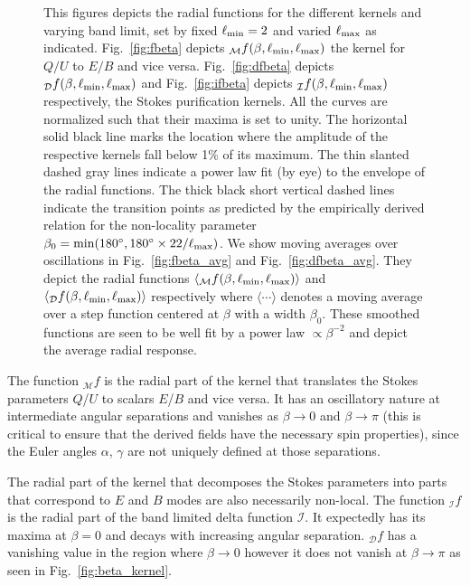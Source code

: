 \documentclass[a4paper,11pt]{article}
\newcommand{\mm}{\mathcal{M}}
\newcommand{\md}{\mathcal{D}}
\newcommand{\mi}{\mathcal{I}}
\def\fig#1{{Fig.~\ref{#1}}}
\begin{document}
\begin{figure}[t]
\caption{This figures depicts the radial functions for the different kernels and varying band limit, set by fixed $\ell_{\rm min}=2$ and varied $\ell_{\rm max}$ as indicated. \fig{fig:fbeta} depicts ${_{\mm}f}(\beta,\ell_{\rm min},\ell_{\rm max})$ the kernel for $Q/U$ to $E/B$ and vice versa. \fig{fig:dfbeta} depicts ${}_{\md}f(\beta,\ell_{\rm min},\ell_{\rm max})$ and  \fig{fig:ifbeta} depicts ${}_{\mi}f(\beta,\ell_{\rm min},\ell_{\rm max})$ respectively, the Stokes purification kernels. All the curves are normalized such that their maxima is set to unity. The horizontal solid black line marks the location where the amplitude of the respective kernels fall below 1\% of its maximum. The thin slanted dashed gray lines indicate a power law fit (by eye) to the envelope of the radial functions. The thick black short vertical dashed lines indicate the transition points as predicted by the empirically derived relation for the non-locality parameter $\beta_0={\rm min}(180^\circ,180^\circ \times 22/\ell_{\rm max})$.  We show moving averages over oscillations in \fig{fig:fbeta_avg} and  \fig{fig:dfbeta_avg}.  They depict the radial functions $\langle{_{\mm}f}(\beta,\ell_{\rm min},\ell_{\rm max})\rangle$ and $\langle{_{\md}f}(\beta,\ell_{\rm min},\ell_{\rm max})\rangle$ respectively where $\langle \cdots \rangle$ denotes a moving average over a step function centered at $\beta$ with a width $\beta_0$. These smoothed functions are seen to be well fit by a power law $\propto \beta^{-2}$  and depict the average radial response.}
\label{fig:rad_ker_decay}
\end{figure}
%

The function ${_{\mm}f}$ is the radial part of the kernel that translates the Stokes parameters $Q$/$U$ to scalars $E$/$B$ and vice versa.  It has an oscillatory nature at intermediate angular separations and vanishes as $\beta \rightarrow 0$ and $\beta \rightarrow \pi$ (this is critical to ensure that the derived fields have the necessary spin properties), since the Euler angles $\alpha$, $\gamma$ are not uniquely defined at those separations.

The radial part of the kernel that decomposes the  Stokes parameters into parts that correspond to $E$ and $B$ modes  are also  necessarily non-local.  The function ${_{\mi}f}$ is the radial part of the band limited delta function $\mi$.  It expectedly has its maxima at $\beta=0$ and decays with increasing angular separation.  ${_{\md}f}$ has a vanishing value in the region where $\beta \rightarrow 0$ however it does not vanish at $\beta \rightarrow \pi$ as seen in \fig{fig:beta_kernel}.
\end{document}
